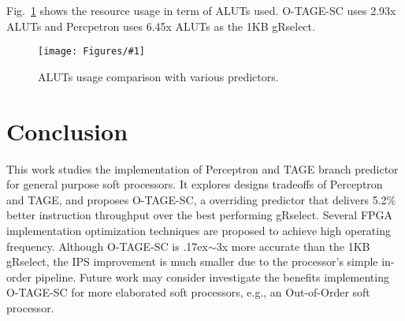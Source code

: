 \documentclass[conference]{IEEEtran}
\newcommand{\mytilde}{{\raise.17ex\hbox{$\scriptstyle\sim$}}}
\newcommand{\kfig}[4]{ %
        \begin{figure}[!t]
        \centering
        \texttt{[image: Figures/\#1]}
        \vspace{-1mm}
        \caption{#3}
        \label{#2}
        \end{figure}
}
\begin{document}
Fig.~\ref{fig:adarea} shows the resource usage in term of ALUTs used. \mbox{O-TAGE-SC} uses 2.93x ALUTs and Percpetron uses 6.45x ALUTs as the 1KB gRselect.
\kfig{adarea.pdf}{fig:adarea}{ALUTs usage comparison with various predictors.}{angle = 0, trim = 0.9in 2.7in 0.7in 2.7in, clip, width=0.4\textwidth}



\section{Conclusion}
This work studies the implementation of Perceptron and TAGE branch predictor for general purpose soft processors. It explores designs tradeoffs of Perceptron and TAGE, and proposes \mbox{O-TAGE-SC}, a overriding predictor that delivers 5.2\% better instruction throughput over the best performing gRselect. Several FPGA implementation optimization techniques are proposed to achieve high operating frequency. Although \mbox{O-TAGE-SC} is \mytilde 3x more accurate than the 1KB gRselect, the IPS improvement is much smaller due to the processor's simple in-order pipeline. Future work may consider investigate the benefits implementing \mbox{O-TAGE-SC} for more elaborated soft processors, e.g., an Out-of-Order soft processor. 









\end{document}
